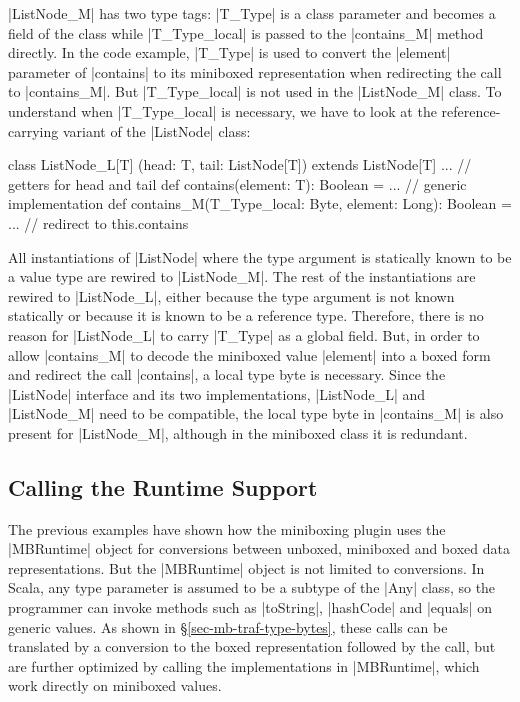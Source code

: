 |ListNode_M| has two type tags: |T_Type| is a class parameter and becomes a field of the class while |T_Type_local| is passed to the |contains_M| method directly. In the code example, |T_Type| is used to convert the |element| parameter of |contains| to its miniboxed representation when redirecting the call to |contains_M|. But |T_Type_local| is not used in the |ListNode_M| class. To understand when |T_Type_local| is necessary, we have to look at the re\-fe\-rence-carrying variant of the |ListNode| class:

\begin{lstlisting-nobreak}
 class ListNode_L[T]
   (head: T, tail: ListNode[T]) extends ListNode[T] {
   ... // getters for head and tail
   def contains(element: T): Boolean = 
         ... // generic implementation
   def contains_M(T_Type_local: Byte, element: Long): Boolean =
         ... // redirect to this.contains
 }
\end{lstlisting-nobreak}

All instantiations of |ListNode| where the type argument is statically known to be a value type are rewired to |ListNode_M|. The rest of the instantiations are rewired to |ListNode_L|, either because the type argument is not known statically or because it is known to be a reference type. Therefore, there is no reason for |ListNode_L| to carry |T_Type| as a global field. But, in order to allow |contains_M| to decode the miniboxed value |element| into a boxed form and redirect the call |contains|, a local type byte is necessary. Since the |ListNode| interface and its two implementations, |ListNode_L| and |ListNode_M| need to be compatible, the local type byte in |contains_M| is also present for |ListNode_M|, although in the miniboxed class it is redundant. 

\subsection{Calling the Runtime Support}
\label{sec-mb-traf-runtime}

The previous examples have shown how the miniboxing plugin uses the |MBRuntime| object for conversions between unboxed, miniboxed and boxed data representations. But the |MBRuntime| object is not limited to conversions. In Scala, any type parameter is assumed to be a subtype of the |Any| class, so the programmer can invoke methods such as |toString|, |hashCode| and |equals| on generic values. As shown in \S\ref{sec-mb-traf-type-bytes}, these calls can be translated by a conversion to the boxed representation followed by the call, but are further optimized by calling the implementations in |MBRuntime|, which work directly on miniboxed values.  

